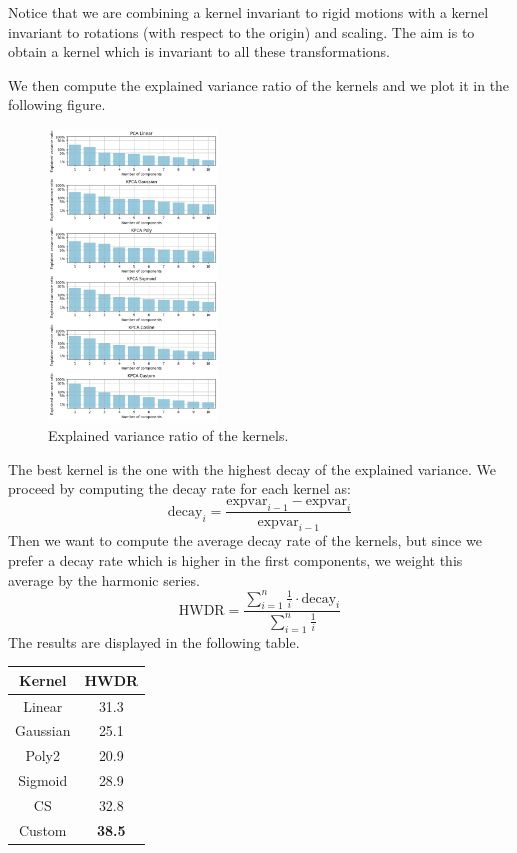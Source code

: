 Notice that we are combining a kernel invariant to rigid motions with 
a kernel invariant to rotations (with respect to the origin) and scaling.
The aim is to obtain a kernel which is invariant to all these transformations.

We then compute the explained variance ratio of the kernels and we
plot it in the following figure.
\begin{figure}[H]
    \centering
    \includegraphics[width=0.4\textwidth]{figures/expvar_ratio_plot.png}
    \caption{Explained variance ratio of the kernels.}
\end{figure}

The best kernel is the one with the highest decay of the explained variance.
We proceed by computing the decay rate for each kernel as:
$$
    \text{decay}_i = \frac{\text{expvar}_{i-1} - \text{expvar}_i}{\text{expvar}_{i-1}}
$$
Then we want to compute the average decay rate of the kernels, but since we
prefer a decay rate which is higher in the first components, we weight this
average by the harmonic series.
$$
    \text{HWDR} = \frac{\sum_{i=1}^{n} \frac{1}{i} \cdot \text{decay}_i}{\sum_{i=1}^{n} \frac{1}{i}}
$$
The results are displayed in the following table.

\begin{table}[H]
    \centering
    \begin{tabular}{|c|c|}
        \hline
        Kernel      & HWDR \\
        \hline
        Linear      & 31.3 \\
        Gaussian    & 25.1 \\
        Poly2       & 20.9 \\
        Sigmoid     & 28.9 \\
        CS          & 32.8 \\
        Custom      & \textbf{38.5} \\
        \hline
    \end{tabular}
\end{table}


